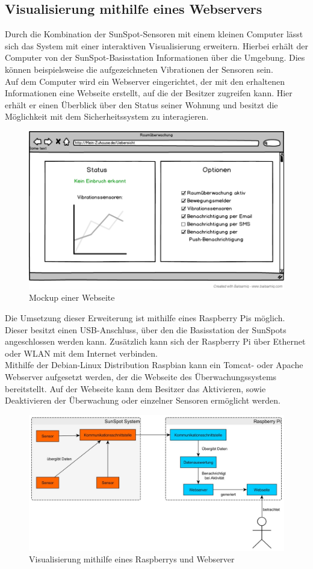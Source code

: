 \subsection{Visualisierung mithilfe eines Webservers}\label{ss:visualisierung}



Durch die Kombination der SunSpot-Sensoren mit einem kleinen Computer lässt sich das System mit einer interaktiven Visualisierung erweitern. Hierbei erhält der Computer von der SunSpot-Basisstation Informationen über die Umgebung. Dies können beispielsweise die aufgezeichneten Vibrationen der Sensoren sein.\\
Auf dem Computer wird ein Webserver eingerichtet, der mit den erhaltenen Informationen eine Webseite erstellt, auf die der Besitzer zugreifen kann. Hier erhält er einen Überblick über den Status seiner Wohnung und besitzt die Möglichkeit mit dem Sicherheitssystem zu interagieren. 

\begin{figure}[H] 
	\centering
	\includegraphics[scale=0.4]{Bilder/mockupwebsite}
	\caption{Mockup einer Webseite}
	\label{f:mockupwebsite}
\end{figure}

Die Umsetzung dieser Erweiterung ist mithilfe eines Raspberry Pis möglich. Dieser besitzt einen USB-Anschluss, über den die Basisstation der SunSpots angeschlossen werden kann. Zusätzlich kann sich der Raspberry Pi über Ethernet oder WLAN mit dem Internet verbinden.\\
Mithilfe der Debian-Linux Distribution Raspbian kann ein Tomcat- oder Apache Webserver aufgesetzt werden, der die Webseite des Überwachungssystems bereitstellt. Auf der Webseite kann dem Besitzer das Aktivieren, sowie Deaktivieren der Überwachung oder einzelner Sensoren ermöglicht werden.

\begin{figure}[H] 
	\centering
	\includegraphics[scale=0.25]{Bilder/Visualisierung}
	\caption{Visualisierung mithilfe eines Raspberrys und Webserver}
	\label{f:visualisierung}
\end{figure}